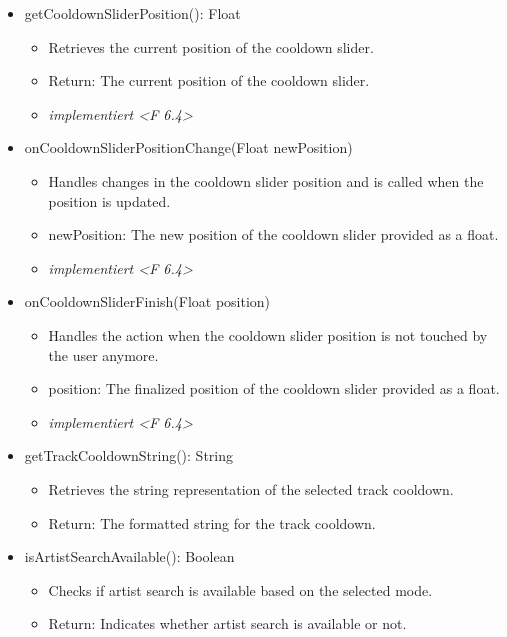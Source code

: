 \documentclass[oneside, ngerman]{sdqtechreport}
\begin{document}
\begin{itemize}
\begin{itemize}
        \end{itemize}
    \item getCooldownSliderPosition(): Float
        \begin{itemize}
            \item Retrieves the current position of the cooldown slider.
            \item Return: The current position of the cooldown slider.
            \item \textit{implementiert <F 6.4>}
        \end{itemize}
    \item onCooldownSliderPositionChange(Float newPosition)
        \begin{itemize}
            \item Handles changes in the cooldown slider position and is called when the position is updated.
            \item newPosition: The new position of the cooldown slider provided as a float.
            \item \textit{implementiert <F 6.4>}
        \end{itemize}
    \item onCooldownSliderFinish(Float position)
        \begin{itemize}
            \item Handles the action when the cooldown slider position is not touched by the user anymore.
            \item position: The finalized position of the cooldown slider provided as a float.
            \item \textit{implementiert <F 6.4>}
        \end{itemize}
    \item getTrackCooldownString(): String
        \begin{itemize}
            \item Retrieves the string representation of the selected track cooldown.
            \item Return: The formatted string for the track cooldown.
        \end{itemize}
    \item isArtistSearchAvailable(): Boolean
        \begin{itemize}
            \item Checks if artist search is available based on the selected mode.
            \item Return: Indicates whether artist search is available or not.

\end{itemize}
\end{itemize}
\end{document}
